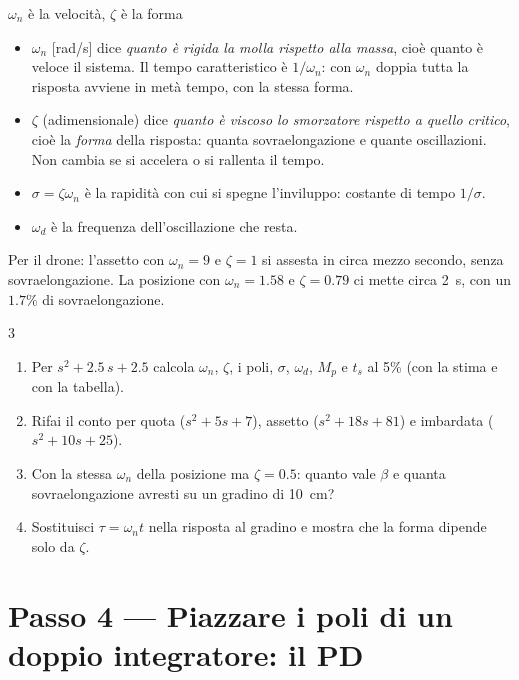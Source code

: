 \documentclass[11pt,a4paper]{article}
\begin{document}
\begin{fisica}{$\omega_n$ è la velocità, $\zeta$ è la forma}
\begin{itemize}
  \item \textbf{$\omega_n$} [rad/s] dice \emph{quanto è rigida la molla rispetto alla massa}, cioè quanto è veloce il sistema. Il tempo caratteristico è $1/\omega_n$: con $\omega_n$ doppia tutta la risposta avviene in metà tempo, con la stessa forma.
  \item \textbf{$\zeta$} (adimensionale) dice \emph{quanto è viscoso lo smorzatore rispetto a quello critico}, cioè la \emph{forma} della risposta: quanta sovraelongazione e quante oscillazioni. Non cambia se si accelera o si rallenta il tempo.
  \item \textbf{$\sigma = \zeta\omega_n$} è la rapidità con cui si spegne l'inviluppo: costante di tempo $1/\sigma$.
  \item \textbf{$\omega_d$} è la frequenza dell'oscillazione che resta.
\end{itemize}
Per il drone: l'assetto con $\omega_n = 9$ e $\zeta = 1$ si assesta in circa mezzo secondo, senza sovraelongazione. La posizione con $\omega_n = 1.58$ e $\zeta = 0.79$ ci mette circa 2~s, con un $1.7\%$ di sovraelongazione.
\end{fisica}

\begin{esercizio}{3}
\begin{enumerate}[label=(\alph*)]
  \item Per $s^2 + 2.5\,s + 2.5$ calcola $\omega_n$, $\zeta$, i poli, $\sigma$, $\omega_d$, $M_p$ e $t_s$ al 5\% (con la stima e con la tabella).
  \item Rifai il conto per quota ($s^2 + 5s + 7$), assetto ($s^2 + 18s + 81$) e imbardata ($s^2 + 10s + 25$).
  \item Con la stessa $\omega_n$ della posizione ma $\zeta = 0.5$: quanto vale $\beta$ e quanta sovraelongazione avresti su un gradino di 10~cm?
  \item Sostituisci $\tau = \omega_n t$ nella risposta al gradino e mostra che la forma dipende solo da $\zeta$.
\end{enumerate}
\end{esercizio}

\section{Passo 4 --- Piazzare i poli di un doppio integratore: il PD}
\end{document}

